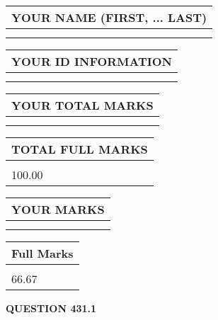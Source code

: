 \documentclass{ctexart}
\begin{document}
   
   
   
\newpage 
\setcounter{page}{ 
   431001 } 
   
   
   
   
\noindent\begin{tabular}{|l|}
\hline
YOUR NAME (FIRST, ... LAST)  \\
\hline
 \\ 
 \\ 
\hline
\end{tabular}
\hspace{0.05in} \begin{tabular}{|l|}
\hline
 YOUR   ID   INFORMATION  \\
\hline
 \\ 
 \\ 
\hline
\end{tabular}
   
   
\vspace{0.2in}\noindent\begin{tabular}{|l|}
\hline
YOUR TOTAL MARKS  \\
\hline
 \\ 
 \\ 
\hline
\end{tabular}
\hspace{0.05in} \begin{tabular}{|l|}
\hline
TOTAL FULL MARKS  \\
\hline
 \\ 
100.00 \\
\hline
\end{tabular}
   
   
 \vspace{0.2in}
 
 
 
 
   
   
  
\vspace{0.2in}
  
\noindent\begin{tabular}{|l|}
\hline
 YOUR MARKS  \\
\hline
 \\ 
 \\ 
\hline
\end{tabular}
\hspace{0.05in} \begin{tabular}{|l|}
\hline
 Full Marks  \\
\hline
 \\ 
66.67 \\
\hline
\end{tabular}
{\textbf{\Large{QUESTION
431.1 
}}}
  
\end{document}
